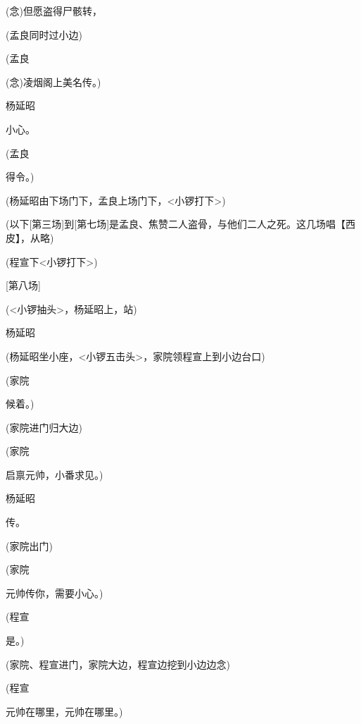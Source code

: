 {({\akai 念})但愿盗得尸骸转，

(孟良同时过小边)

(孟良\hspace{30pt}~

({\akai 念})凌烟阁上美名传。)

杨延昭\hspace{20pt}~

小心。

(孟良\hspace{30pt}~

得令。)

(杨延昭由下场门下，孟良上场门下，{\textless{}小锣打下\textgreater{}})

{(}以下{[}第三场{]}到{[}第七场{]}是孟良、焦赞二人盗骨，与他们二人之死。这几场唱【{\akai 西皮}】，从略{)}

(程宣下{\textless{}小锣打下\textgreater{}})

{[}第八场{]}

{(\textless{}小锣抽头\textgreater{}，}杨延昭上，站{)}

杨延昭\hspace{20pt}~


{(}杨延昭坐小座，{\textless{}小锣五击头\textgreater{}，}家院领程宣上到小边台口{)}

{(家院\hspace{30pt}~

候着。)}

{(}家院进门归大边{)}

{(家院\hspace{30pt}~

启禀元帅，小番求见。)}

杨延昭\hspace{20pt}~

传。

{(}家院出门{)}

{(家院\hspace{30pt}~

元帅传你，需要小心。)}

{(程宣\hspace{30pt}~

是。)}

{(家院}、{程宣}进门{，家院}大边{，程宣}边挖到小边边念{)}

{(程宣\hspace{30pt}~

元帅在哪里，元帅在哪里。)}

}
